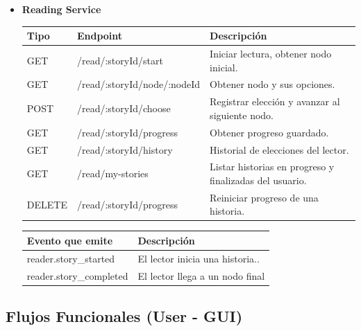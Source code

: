 \documentclass[a4paper,11 pt]{article}
\begin{document}
\begin{itemize}
    \item \textbf{Reading Service}
    \begin{table}[H]
        \footnotesize{
        \centering
        \begin{tabular}{|M{0.1\textwidth}|M{0.3\textwidth}|M{0.4\textwidth}|}
            \hline
            \textbf{Tipo} &\textbf{Endpoint} & \textbf{Descripción} \\
            \hline
             GET & /read/:storyId/start & Iniciar lectura, obtener nodo inicial.  \\
             \hline
             GET & /read/:storyId/node/:nodeId & Obtener nodo y sus opciones. \\
             \hline
             POST & /read/:storyId/choose & Registrar elección y avanzar al siguiente nodo. \\
             \hline
             GET & /read/:storyId/progress & Obtener progreso guardado.\\
             \hline
             GET & /read/:storyId/history & Historial de elecciones del lector.\\
             \hline
             GET & /read/my-stories & Listar historias en progreso y finalizadas del usuario.\\
             \hline
             DELETE & /read/:storyId/progress & Reiniciar progreso de una historia.\\
             \hline
        \end{tabular}
        \label{t13}
        }
    \end{table}

    \begin{table}[H]
        \footnotesize{
        \centering
        \begin{tabular}{|M{0.4\textwidth}|M{0.5\textwidth}|}
            \hline
            \textbf{Evento que emite} & \textbf{Descripción} \\
            \hline
             reader.story\_started & El lector inicia una historia..  \\
             \hline
             reader.story\_completed & El lector llega a un nodo final  \\
             \hline
        \end{tabular}
        \label{t13}
        }
    \end{table} 
\end{itemize}

\subsection{Flujos Funcionales (User - GUI)}
\end{document}
